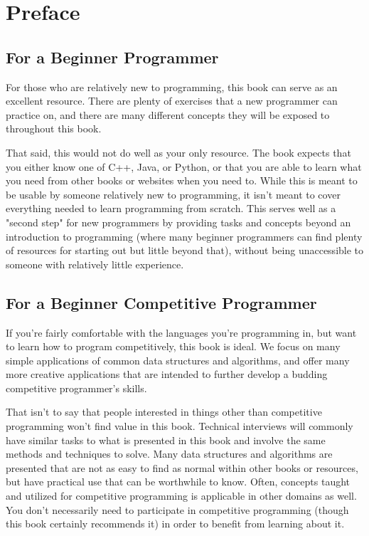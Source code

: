 \section*{Preface}

\subsection*{For a Beginner Programmer}

For those who are relatively new to programming, this book can serve as an excellent resource. There are plenty of exercises that a new programmer can practice on, and there are many different concepts they will be exposed to throughout this book.

That said, this would not do well as your only resource. The book expects that you either know one of C++, Java, or Python, or that you are able to learn what you need from other books or websites when you need to. While this is meant to be usable by someone relatively new to programming, it isn't meant to cover everything needed to learn programming from scratch. This serves well as a "second step" for new programmers by providing tasks and concepts beyond an introduction to programming (where many beginner programmers can find plenty of resources for starting out but little beyond that), without being unaccessible to someone with relatively little experience.

\subsection*{For a Beginner Competitive Programmer}

If you're fairly comfortable with the languages you're programming in, but want to learn how to program competitively, this book is ideal. We focus on many simple applications of common data structures and algorithms, and offer many more creative applications that are intended to further develop a budding competitive programmer's skills.

That isn't to say that people interested in things other than competitive programming won't find value in this book. Technical interviews will commonly have similar tasks to what is presented in this book and involve the same methods and techniques to solve. Many data structures and algorithms are presented that are not as easy to find as normal within other books or resources, but have practical use that can be worthwhile to know. Often, concepts taught and utilized for competitive programming is applicable in other domains as well. You don't necessarily need to participate in competitive programming (though this book certainly recommends it) in order to benefit from learning about it.

